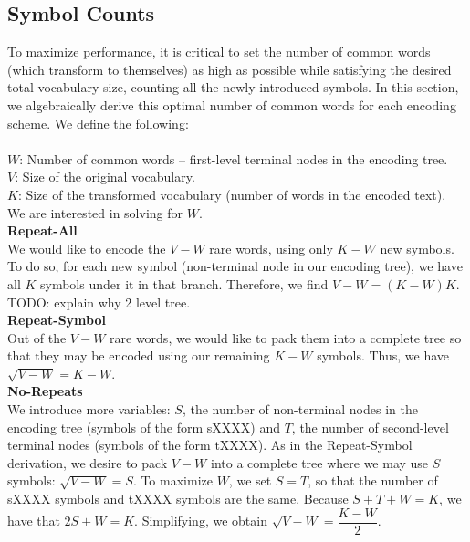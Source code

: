\subsection{Symbol Counts}
To maximize performance, it is critical to set the number of common words (which
transform to themselves) as high as possible while satisfying the desired total vocabulary size,
counting all the newly introduced symbols. In this section, we algebraically derive
this optimal number of common words for each encoding scheme. We define the following:\\\\
$W$: Number of common words -- first-level terminal nodes in the encoding tree.\\
$V$: Size of the original vocabulary.\\
$K$: Size of the transformed vocabulary (number of words in the encoded text).\\

We are interested in solving for $W$.\\

\textbf{Repeat-All}\\
We would like to encode the $V - W$ rare words, using only $K - W$ new symbols. To do so,
for each new symbol (non-terminal node in our encoding tree), we have all $K$ symbols under
it in that branch. Therefore, we find $V - W = (K - W)K$.\\

TODO: explain why 2 level tree.\\

\textbf{Repeat-Symbol}\\
Out of the $V - W$ rare words, we would like to pack them into a complete tree so that
they may be encoded using our remaining $K - W$ symbols. Thus, we have $\sqrt{V - W} = K - W$.\\

\textbf{No-Repeats}\\
We introduce more variables: $S$, the number of non-terminal nodes in the encoding tree (symbols
of the form sXXXX) and $T$, the number of second-level terminal nodes (symbols of the form tXXXX).
As in the Repeat-Symbol derivation, we desire to pack $V - W$ into a complete tree where we
may use $S$ symbols: $\sqrt{V - W} = S$. To maximize $W$, we set $S = T$, so that the number of sXXXX symbols and tXXXX
symbols are the same. Because $S + T + W = K$, we have that $2S + W = K$. Simplifying, we obtain
$\sqrt{V - W} = \dfrac{K - W}{2}$.\\
